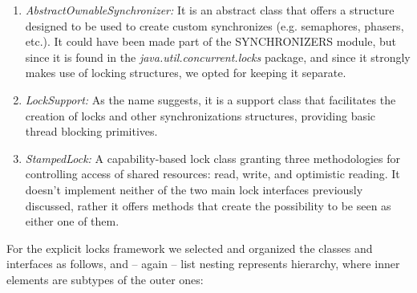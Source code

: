 \documentclass[]{usiinfthesis}
\begin{document}
\begin{enumerate}
    \item \textit{AbstractOwnableSynchronizer:} It is an abstract class that offers a structure designed to be used to create custom synchronizes (e.g. semaphores, phasers, etc.). It could have been made part of the SYNCHRONIZERS module, but since it is found in the \textit{java.util.concurrent.locks} package, and since it strongly makes use of locking structures, we opted for keeping it separate. 
    \item \textit{LockSupport:} As the name suggests, it is a support class that facilitates the creation of locks and other synchronizations structures, providing basic thread blocking primitives. 
    \item \textit{StampedLock:} A capability-based lock class granting three methodologies for controlling access of shared resources: read, write, and optimistic reading. It doesn't implement neither of the two main lock interfaces previously discussed, rather it offers methods that create the possibility to be seen as either one of them.
\end{enumerate}

\noindent
For the explicit locks framework we selected and organized the classes and interfaces as follows, and -- again -- list nesting represents hierarchy, where inner elements are subtypes of the outer ones:
\end{document}
